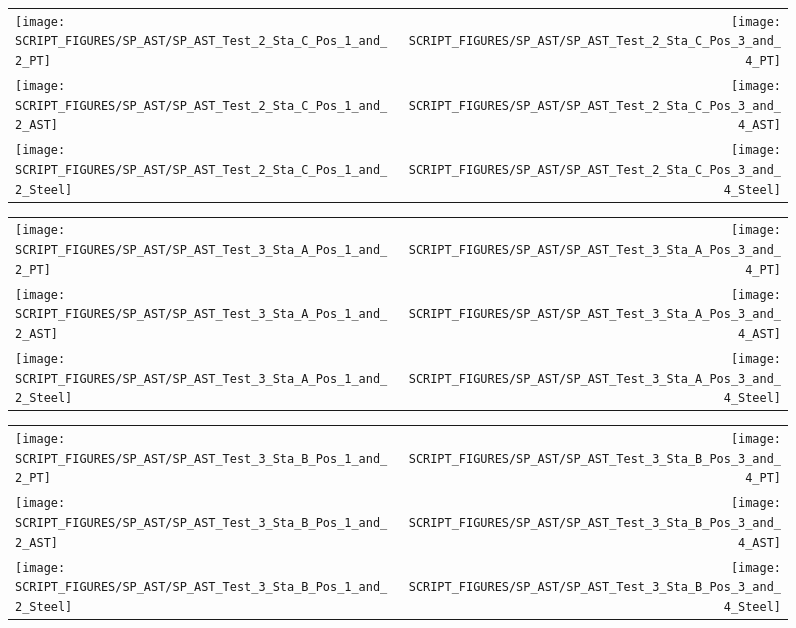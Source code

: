 \begin{figure}[p]
\begin{tabular*}{\textwidth}{l@{\extracolsep{\fill}}r}
\texttt{[image: SCRIPT\_FIGURES/SP\_AST/SP\_AST\_Test\_2\_Sta\_C\_Pos\_1\_and\_2\_PT]} &
\texttt{[image: SCRIPT\_FIGURES/SP\_AST/SP\_AST\_Test\_2\_Sta\_C\_Pos\_3\_and\_4\_PT]} \\
\texttt{[image: SCRIPT\_FIGURES/SP\_AST/SP\_AST\_Test\_2\_Sta\_C\_Pos\_1\_and\_2\_AST]} &
\texttt{[image: SCRIPT\_FIGURES/SP\_AST/SP\_AST\_Test\_2\_Sta\_C\_Pos\_3\_and\_4\_AST]} \\
\texttt{[image: SCRIPT\_FIGURES/SP\_AST/SP\_AST\_Test\_2\_Sta\_C\_Pos\_1\_and\_2\_Steel]} &
\texttt{[image: SCRIPT\_FIGURES/SP\_AST/SP\_AST\_Test\_2\_Sta\_C\_Pos\_3\_and\_4\_Steel]}
\end{tabular*}
\label{SP_Test_2_Station_C}
\end{figure}


\begin{figure}[p]
\begin{tabular*}{\textwidth}{l@{\extracolsep{\fill}}r}
\texttt{[image: SCRIPT\_FIGURES/SP\_AST/SP\_AST\_Test\_3\_Sta\_A\_Pos\_1\_and\_2\_PT]} &
\texttt{[image: SCRIPT\_FIGURES/SP\_AST/SP\_AST\_Test\_3\_Sta\_A\_Pos\_3\_and\_4\_PT]} \\
\texttt{[image: SCRIPT\_FIGURES/SP\_AST/SP\_AST\_Test\_3\_Sta\_A\_Pos\_1\_and\_2\_AST]} &
\texttt{[image: SCRIPT\_FIGURES/SP\_AST/SP\_AST\_Test\_3\_Sta\_A\_Pos\_3\_and\_4\_AST]} \\
\texttt{[image: SCRIPT\_FIGURES/SP\_AST/SP\_AST\_Test\_3\_Sta\_A\_Pos\_1\_and\_2\_Steel]} &
\texttt{[image: SCRIPT\_FIGURES/SP\_AST/SP\_AST\_Test\_3\_Sta\_A\_Pos\_3\_and\_4\_Steel]}
\end{tabular*}
\label{SP_Test_3_Station_A}
\end{figure}

\begin{figure}[p]
\begin{tabular*}{\textwidth}{l@{\extracolsep{\fill}}r}
\texttt{[image: SCRIPT\_FIGURES/SP\_AST/SP\_AST\_Test\_3\_Sta\_B\_Pos\_1\_and\_2\_PT]} &
\texttt{[image: SCRIPT\_FIGURES/SP\_AST/SP\_AST\_Test\_3\_Sta\_B\_Pos\_3\_and\_4\_PT]} \\
\texttt{[image: SCRIPT\_FIGURES/SP\_AST/SP\_AST\_Test\_3\_Sta\_B\_Pos\_1\_and\_2\_AST]} &
\texttt{[image: SCRIPT\_FIGURES/SP\_AST/SP\_AST\_Test\_3\_Sta\_B\_Pos\_3\_and\_4\_AST]} \\
\texttt{[image: SCRIPT\_FIGURES/SP\_AST/SP\_AST\_Test\_3\_Sta\_B\_Pos\_1\_and\_2\_Steel]} &
\texttt{[image: SCRIPT\_FIGURES/SP\_AST/SP\_AST\_Test\_3\_Sta\_B\_Pos\_3\_and\_4\_Steel]}
\end{tabular*}
\label{SP_Test_3_Station_B}
\end{figure}

